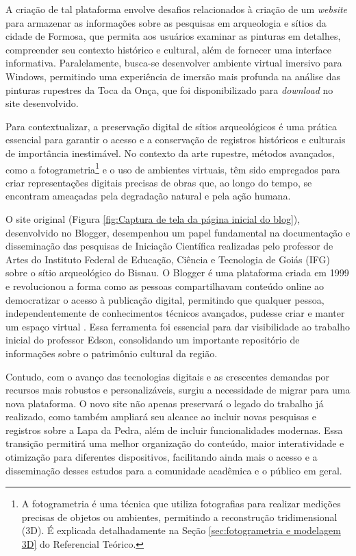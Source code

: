 A criação de tal plataforma envolve desafios relacionados à criação de um \textit{website} para armazenar as informações sobre as pesquisas em arqueologia e sítios da cidade de Formosa, que permita aos usuários examinar as pinturas em detalhes, compreender seu contexto histórico e cultural, além de fornecer uma interface informativa. Paralelamente, busca-se desenvolver ambiente virtual imersivo para Windows, permitindo uma experiência de imersão mais profunda na análise das pinturas rupestres da Toca da Onça, que foi disponibilizado para \textit{download} no site desenvolvido. 

Para contextualizar, a preservação digital de sítios arqueológicos é uma prática essencial para garantir o acesso e a conservação de registros históricos e culturais de importância inestimável. No contexto da arte rupestre, métodos avançados, como a fotogrametria\footnote{A fotogrametria é uma técnica que utiliza fotografias para realizar medições precisas de objetos ou ambientes, permitindo a reconstrução tridimensional (3D). É explicada detalhadamente na Seção \ref{sec:fotogrametria e modelagem 3D} do Referencial Teórico.} e o uso de ambientes virtuais, têm sido empregados para criar representações digitais precisas de obras que, ao longo do tempo, se encontram ameaçadas pela degradação natural e pela ação humana.

O site original (Figura \ref{fig:Captura de tela da página inicial do blog}), desenvolvido no Blogger, desempenhou um papel fundamental na documentação e disseminação das pesquisas de Iniciação Científica realizadas pelo professor de Artes do Instituto Federal de Educação, Ciência e Tecnologia de Goiás (IFG) sobre o sítio arqueológico do Bisnau. O Blogger é uma plataforma criada em 1999 e revolucionou a forma como as pessoas compartilhavam conteúdo online ao democratizar o acesso à publicação digital, permitindo que qualquer pessoa, independentemente de conhecimentos técnicos avançados, pudesse criar e manter um espaço virtual \citep{BALLARD2012105}. Essa ferramenta foi essencial para dar visibilidade ao trabalho inicial do professor Edson, consolidando um importante repositório de informações sobre o patrimônio cultural da região.

Contudo, com o avanço das tecnologias digitais e as crescentes demandas por recursos mais robustos e personalizáveis, surgiu a necessidade de migrar para uma nova plataforma. O novo site não apenas preservará o legado do trabalho já realizado, como também ampliará seu alcance ao incluir novas pesquisas e registros sobre a Lapa da Pedra, além de incluir funcionalidades modernas. Essa transição permitirá uma melhor organização do conteúdo, maior interatividade e otimização para diferentes dispositivos, facilitando ainda mais o acesso e a disseminação desses estudos para a comunidade acadêmica e o público em geral.

